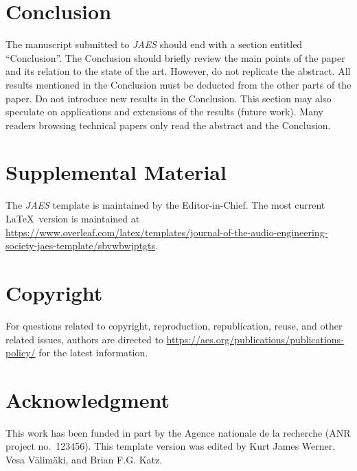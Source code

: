 \documentclass[fleqn,draft]{jaes}
\begin{document}
\section{Conclusion}\label{sec:conc}
The manuscript submitted to \emph{JAES} should end with a section entitled ``Conclusion''. The Conclusion should briefly review the main points of the paper and its relation to the state of the art. However, do not replicate the abstract. All results mentioned in the Conclusion must be deducted from the other parts of the paper. Do not introduce new results in the Conclusion. This section may also speculate on applications and extensions of the results (future work). Many readers browsing technical papers only read the abstract and the Conclusion.

\section{Supplemental Material}

The \emph{JAES} template is maintained by the Editor-in-Chief. The most current \LaTeX\ version is maintained at \href{https://www.overleaf.com/latex/templates/journal-of-the-audio-engineering-society-jaes-template/sbvwbwjptgts}{https://www.overleaf.com/latex/templates/journal-of-the-audio-engineering-society-jaes-template/sbvwbwjptgts}.

\section{Copyright}\label{sec:Copyright}

For questions related to copyright, reproduction, republication, reuse, and other related issues, authors are directed to \url{https://aes.org/publications/publications-policy/} for the latest information. 

\section{Acknowledgment}
This  work  has  been  funded  in  part  by  the Agence nationale de la recherche (ANR project no.~123456). This template version was edited by Kurt James Werner, Vesa V\"alim\"aki, and Brian F.G. Katz. 




\end{document}
